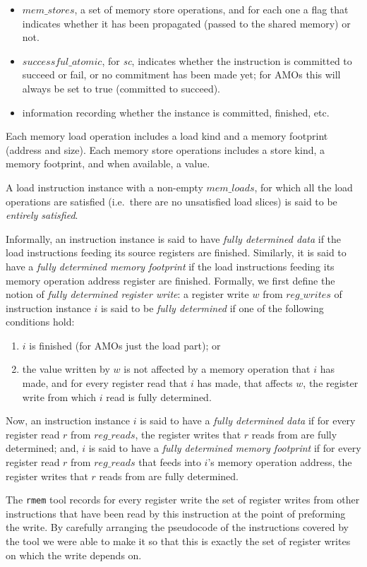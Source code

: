 \begin{itemize}
\item $mem\_stores$, a set of memory store operations, and for each one a flag that indicates whether it has been propagated (passed to the shared memory) or not.
\item $successful\_atomic$, for {\em sc}, indicates whether the instruction is committed to succeed or fail, or no commitment has been made yet; for AMOs this will always be set to true (committed to succeed).
\item information recording whether the instance is committed, finished, etc.
\end{itemize}

Each memory load operation includes a load kind and a memory footprint (address and size).
Each memory store operations includes a store kind, a memory footprint, and when available, a value.

A load instruction instance with a non-empty $mem\_loads$, for which all the load operations are satisfied (i.e.~there are no unsatisfied load slices) is said to be {\it entirely satisfied}.

Informally, an instruction instance is said to have {\it fully determined data} if the load instructions feeding its source registers are finished.
Similarly, it is said to have a {\it fully determined memory footprint} if the load instructions feeding its memory operation address register are finished.
%
Formally, we first define the notion of {\it fully determined register write}: a register write $w$ from $reg\_writes$ of instruction instance $i$ is said to be {\it fully determined} if one of the following conditions hold:
\begin{enumerate}
\item $i$ is finished (for AMOs just the load part); or
\item the value written by $w$ is not affected by a memory operation that $i$ has made, and for every register read that $i$ has made, that affects $w$, the register write from which $i$ read is fully determined.
\end{enumerate}
Now, an instruction instance $i$ is said to have a {\it fully determined data} if for every register read $r$ from $reg\_reads$, the register writes that $r$ reads from are fully determined;
and, $i$ is said to have a {\it fully determined memory footprint} if for every register read $r$ from $reg\_reads$ that feeds into $i$'s memory operation address, the register writes that $r$ reads from are fully determined.
\begin{commentary}
The {\tt rmem} tool records for every register write the set of register writes from other instructions that have been read by this instruction at the point of preforming the write.
By carefully arranging the pseudocode of the instructions covered by the tool we were able to make it so that this is exactly the set of register writes on which the write depends on.
\end{commentary}

